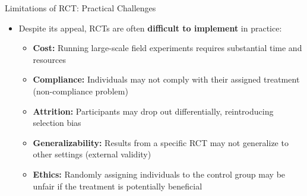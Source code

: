 \documentclass[hyperref={pdfpagelabels=false}]{beamer}
\begin{document}
\begin{frame}{Limitations of RCT: Practical Challenges}
	\begin{itemize}
		\item Despite its appeal, RCTs are often \textbf{difficult to implement} in practice:
		\vspace{0.2cm}
		\begin{itemize}
		\item \textbf{Cost:} Running large-scale field experiments requires substantial time and resources
			\vspace{0.2cm}
			\item \textbf{Compliance:} Individuals may not comply with their assigned treatment (non-compliance problem)
			\vspace{0.2cm}
			\item \textbf{Attrition:} Participants may drop out differentially, reintroducing selection bias
			\vspace{0.2cm}
			\item \textbf{Generalizability:} Results from a specific RCT may not generalize to other settings (external validity)
			\vspace{0.2cm}
\item \textbf{Ethics:} Randomly assigning individuals to the control group may be unfair if the treatment is potentially beneficial		\end{itemize}
	\end{itemize}
\end{frame}
	
\end{document}
